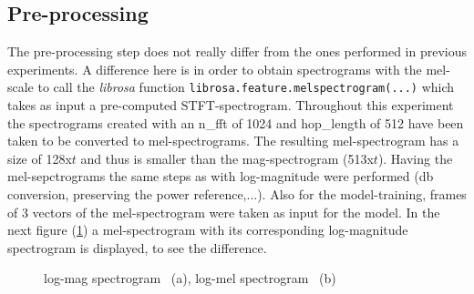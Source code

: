 \subsection{Pre-processing}
The pre-processing step does not really differ from the ones performed in previous experiments. A difference here is in order to obtain spectrograms with the mel-scale to call the \textit{librosa} function \texttt{librosa.feature.melspectrogram(...)} which takes as input a pre-computed STFT-spectrogram. Throughout this experiment the spectrograms created with an n\_fft of 1024 and hop\_length of 512 have been taken to be converted to mel-spectrograms. The resulting mel-spectrogram has a size of 128x$t$ and thus is smaller than the mag-spectrogram (513x$t$). Having the mel-sepctrograms the same steps as with log-magnitude were performed (db conversion, preserving the power reference,...). Also for the model-training, frames of 3 vectors of the mel-spectrogram were taken as input for the model. In the next figure (\ref{fig:exp_mag_mel}) a mel-spectrogram with its corresponding log-magnitude spectrogram is displayed, to see the difference.

\begin{figure}[htb!]
    \centering
    \caption{log-mag spectrogram ~(a), log-mel spectrogram ~(b)}
    \label{fig:exp_mag_mel}
\end{figure}

